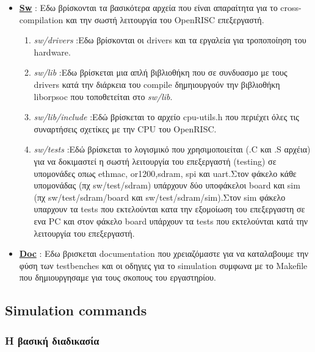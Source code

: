 \documentclass[a4paper,10pt]{article}
\numberwithin{figure}{section}
\numberwithin{table}{section}
\begin{document}
{{\begin{itemize}
\item \underline{{\bf Sw}} : Εδω βρίσκονται τα βασικότερα αρχεία που είναι απαραίτητα για το cross-compilation 
και την σωστή λειτουργία του OpenRISC επεξεργαστή.
					  \begin{enumerate}
                                           \item \emph{sw/drivers} :Εδω βρίσκονται οι drivers και τα εργαλεία για τροποποίηση του hardware.
					   \item \emph{sw/lib} :Eδω βρίσκεται μια απλή βιβλιοθήκη που σε συνδυασμο με τους drivers κατά την διάρκεια του compile δημηιουργούν την βιβλιοθήκη liborpsoc 
που τοποθετείται στο \emph{sw/lib}.
					   \item \emph{sw/lib/include} :Εδώ βρίσκεται το αρχείο cpu-utils.h που περιέχει όλες τις συναρτήσεις σχετίκες
με την CPU του OpenRISC.
					   \item \emph{sw/tests} :Εδώ βρίσκεται το λογισμικό που χρησιμοποιείται (.C και .S αρχέια) για να δοκιμαστεί η σωστή λειτουργία
του επεξεργαστή (testing) σε υπομονάδες οπως ethmac, or1200,sdram, spi και uart.Στον φάκελο κάθε υπομονάδας (πχ sw/test/sdram) υπάρχουν δύο υποφάκελοι board 
και sim (πχ sw/test/sdram/board και sw/test/sdram/sim).Στον sim φάκελο υπαρχουν τα tests που εκτελούνται κατα την εξομοίωση του επεξεργαστη σε ενα PC και στον
φάκελο board υπάρχουν τα tests που εκτελούνται κατά την λειτουργία του επεξεργαστή.
                                          \end{enumerate}

\item \underline{{\bf Doc}} : Εδω βρισκεται documentation που χρειαζόμαστε για να καταλαβουμε την φύση των
testbenches και οι οδηγιες για το simulation συμφωνα με το Makefile που δημιουργησαμε για τους σκοπους του εργαστηρίου.
\end{itemize}
}



\subsection{Simulation commands}{
{
\subsubsection{ Η βασική διαδικασία}
{

}}}}
\end{document}
